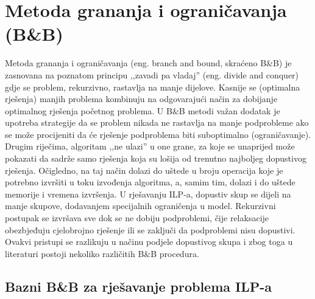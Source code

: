 \documentclass[a4paper, utf8, 11pt, colorlinks]{book}
\theoremstyle{definition}
\begin{document}
\section{Metoda grananja i ograničavanja (B\&B)}\label{sec:bb}
Metoda grananja i ograničavanja (eng. branch and bound, skraćeno B\&B) je zasnovana na poznatom principu ,,zavadi pa vladaj'' (eng. divide and conquer) gdje se problem, rekurzivno, rastavlja na manje dijelove. Kasnije se (optimalna rješenja) manjih problema kombinuju na odgovarajući način za dobijanje optimalnog rješenja početnog problema.  U B\&B metodi važan dodatak je upotreba strategije da se 
problem nikada ne rastavlja na manje podprobleme ako se može procijeniti da će rješenje podproblema biti suboptimalno (ograničavanje). Drugim riječima, algoritam ,,ne ulazi'' u one grane, za koje se unaprijed može pokazati da sadrže samo  rješenja koja su lošija od trenutno najboljeg dopustivog rješenja. Očigledno, na taj način dolazi do uštede u broju operacija koje je potrebno izvršiti u toku izvođenja algoritma, a, samim tim, dolazi i do uštede memorije i vremena izvršenja. U rješavanju ILP-a, dopustiv skup se dijeli na manje skupove, dodavanjem specijalnih ograničenja u model. Rekurzivni postupak se izvršava sve  dok se ne dobiju podproblemi, čije relaksacije obezbjeđuju cjelobrojno rješenje ili se zaključi da podproblemi nisu dopustivi. Ovakvi pristupi se razlikuju u načinu podjele dopustivog skupa i zbog toga  u literaturi  postoji nekoliko različitih B\&B procedura. 

\subsection{Bazni B\&B za rješavanje problema ILP-a}
\end{document}
